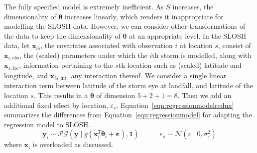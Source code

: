 The fully specified model is extremely inefficient. As $S$ increases, the dimensionality of
    $\bm{\theta}$ increases linearly, which renders it inappropriate for modelling the SLOSH data.  
    However, we can consider other transformations of the data to keep the dimensionality of 
    $\bm{\theta}$ at an appropriate level.
    In the SLOSH data, let $\bm{x}_{is}$, the covariates associated with observation $i$ at location $s$,
    consist of $\bm{x}_{i,\text{obs}}$, the (scaled) parameters under which the $i$th storm is modelled,
    along with $\bm{x}_{s,\text{loc}}$, information pertaining to the $s$th location such as (scaled) 
    latitude and longitude, and $\bm{x}_{is,\text{int}}$, any interaction thereof.  We consider a 
    single linear interaction term between latitude of the storm eye at landfall, and latitude of the
    location $s$.  This results in a $\bm{\theta}$ of dimension $5 + 2 + 1 = 8$.  Then we add
    an additional fixed effect by location, $\varepsilon_s$. Equation~\eqref{eqn:regressionmodelredux}
    summarizes the differences from Equation~\eqref{eqn:regressionmodel} for adapting the regression
    model to SLOSH.
    \begin{equation}
        \label{eqn:regressionmodelredux}
        \bm{y}_i \sim 
            \mathcal{PG}\left(\bm{y}\mid g(\bm{x}_i^T\bm{\theta}_i + \bm{\varepsilon}), \bm{1}\right)
            \;\hspace{1cm}\;
            \varepsilon_s \sim \mathcal{N}(\varepsilon \mid 0, \sigma_{\varepsilon}^2)
    \end{equation}
    where $\bm{x}_i$ is overloaded as discussed.  


    
